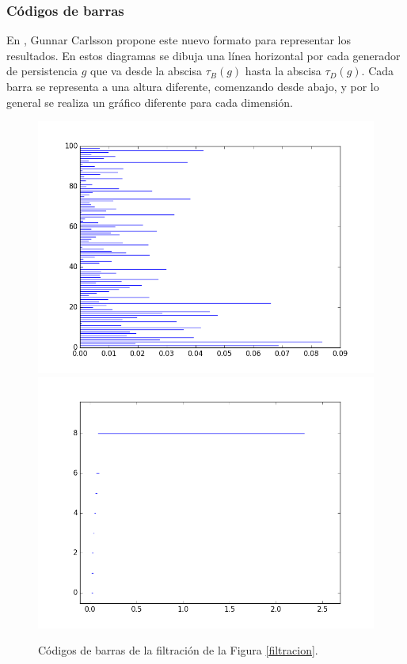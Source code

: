 \documentclass[12pt,a4paper,twoside]{article} %
\theoremstyle{plain}
\theoremstyle{definition}
\begin{document}
\subsubsection{Códigos de barras}
En \cite{Carlsson}, Gunnar Carlsson propone este nuevo formato para representar los resultados. En estos diagramas se dibuja una línea horizontal por cada generador de persistencia $g$ que va desde la abscisa $\tau_B(g)$ hasta la abscisa $\tau_D(g)$. Cada barra se representa a una altura diferente, comenzando desde abajo, y por lo general se realiza un gráfico diferente para cada dimensión.

\begin{figure}[h!]
\centering
\includegraphics[scale=0.33]{img/bars0.png}
\includegraphics[scale=0.33]{img/bars.png}
\caption{Códigos de barras de la filtración de la Figura \ref{filtracion}.}
\label{barras}
\end{figure}
\end{document}
